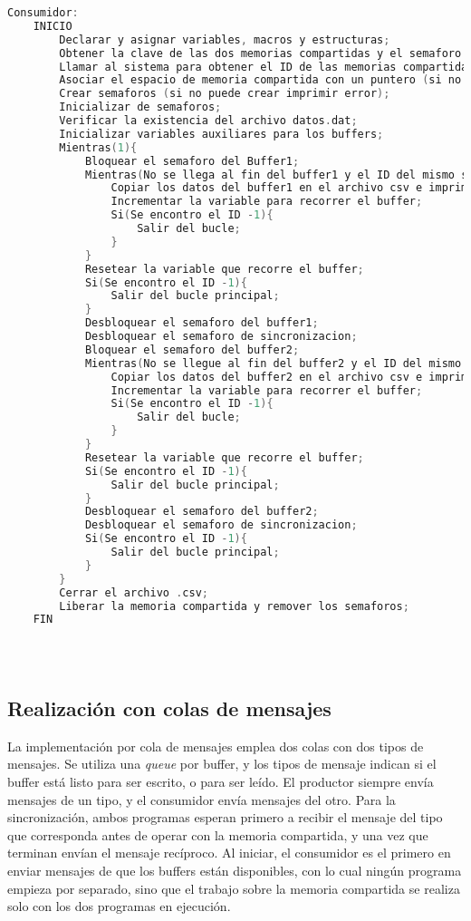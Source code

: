 \begin{lstlisting}[language=C]
    Consumidor:
    INICIO
        Declarar y asignar variables, macros y estructuras;
        Obtener la clave de las dos memorias compartidas y el semaforo (en el caso de no obtenerlas imprimir error);
        Llamar al sistema para obtener el ID de las memorias compartidas (en el caso de que no obtenerlas imprimir error);
        Asociar el espacio de memoria compartida con un puntero (si no puede asociar imprimir error);
        Crear semaforos (si no puede crear imprimir error);
        Inicializar de semaforos;
        Verificar la existencia del archivo datos.dat;
        Inicializar variables auxiliares para los buffers;
        Mientras(1){
	        Bloquear el semaforo del Buffer1;
	        Mientras(No se llega al fin del buffer1 y el ID del mismo sea distinto a -1){
		        Copiar los datos del buffer1 en el archivo csv e imprimirlos en pantalla;
		        Incrementar la variable para recorrer el buffer;
		        Si(Se encontro el ID -1){
			        Salir del bucle;
                }
	        }
	        Resetear la variable que recorre el buffer;
	        Si(Se encontro el ID -1){
	            Salir del bucle principal;
            }
            Desbloquear el semaforo del buffer1;
            Desbloquear el semaforo de sincronizacion;
            Bloquear el semaforo del buffer2;
		    Mientras(No se llegue al fin del buffer2 y el ID del mismo sea distinto a -1){
		        Copiar los datos del buffer2 en el archivo csv e imprimirlos en pantalla;
		        Incrementar la variable para recorrer el buffer;
		        Si(Se encontro el ID -1){
			        Salir del bucle;
                }
	        }
	        Resetear la variable que recorre el buffer;
	        Si(Se encontro el ID -1){
	            Salir del bucle principal;
            }
            Desbloquear el semaforo del buffer2;
            Desbloquear el semaforo de sincronizacion;
            Si(Se encontro el ID -1){
	            Salir del bucle principal;
            }
        }
        Cerrar el archivo .csv;
        Liberar la memoria compartida y remover los semaforos;
    FIN

    
    
\end{lstlisting}

\subsection{Realización con colas de mensajes}

La implementación por cola de mensajes emplea dos colas con dos tipos de mensajes. Se utiliza una \textit{queue} por buffer, y los tipos de mensaje indican si el buffer está listo para ser escrito, o para ser leído. El productor siempre envía mensajes de un tipo, y el consumidor envía mensajes del otro. Para la sincronización, ambos programas esperan primero a recibir el mensaje del tipo que corresponda antes de operar con la memoria compartida, y una vez que terminan envían el mensaje recíproco. Al iniciar, el consumidor es el primero en enviar mensajes de que los buffers están disponibles, con lo cual ningún programa empieza por separado, sino que el trabajo sobre la memoria compartida se realiza solo con los dos programas en ejecución.\\

